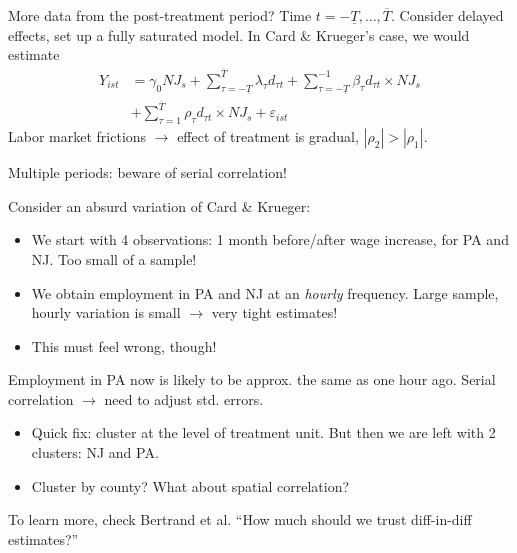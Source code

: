 \documentclass[notes=show,beamer,compress]{beamer}
\begin{document}
\begin{frame}{More data from the post-treatment period?}
Time $t=-\underline{T},\dots, \overline{T}$. Consider delayed effects, set up a fully saturated model. In Card \& Krueger's case, we would estimate
\begin{align*}
Y_{ist} &= \gamma_0NJ_s + \sum_{\tau=-\underline{T}}^{\overline{T}}\lambda_\tau{}d_{\tau t} +  \sum_{\tau=-\underline{T}}^{-1}\beta_\tau d_{\tau t}\times{}NJ_s\\
&+ \sum_{\tau=1}^{\overline{T}}\rho_\tau d_{\tau t}\times{}NJ_s + \varepsilon_{ist}
\end{align*}
Labor market frictions $\to$ effect of treatment is gradual, $|\rho_2|>|\rho_1|$.
\end{frame}

\begin{frame}{Multiple periods: beware of serial correlation!}

Consider an absurd variation of Card \& Krueger:
\begin{itemize}
	\item{We start with 4 observations: 1 month before/after wage increase, for PA and NJ. Too small of a sample!}
	\item{We obtain employment in PA and NJ at an \emph{hourly} frequency. Large sample, hourly variation is small $\to$ very tight estimates!}
	\item{This must feel wrong, though!}
\end{itemize}
Employment in PA now is likely to be approx. the same as one hour ago. Serial correlation $\rightarrow$ need to adjust std. errors.
\begin{itemize}
	\item{Quick fix: cluster at the level of treatment unit. But then we are left with 2 clusters: NJ and PA.}
	\item{Cluster by county? What about spatial correlation?}
\end{itemize}
To learn more, check Bertrand et al. ``How much should we trust diff-in-diff estimates?''
\end{frame}
\end{document}
